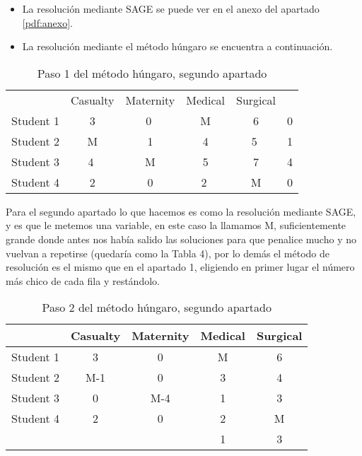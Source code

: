 \documentclass[11pt]{article}
\begin{document}
\begin{itemize}
    \item La resolución mediante SAGE se puede ver en el anexo del apartado \ref{pdf:anexo}.
    \item La resolución mediante el método húngaro se encuentra a continuación.\\
\end{itemize}

\begin{table}[H]
\centering
\begin{tabular}{lccccl}
\cline{1-5}
 & \multicolumn{1}{l}{Casualty} & \multicolumn{1}{l}{Maternity} & \multicolumn{1}{l}{Medical} & \multicolumn{1}{l}{Surgical} &  \\ \cline{1-5}
Student 1 & 3 & \textcircled{0} & M & 6 & 0 \\
Student 2 & M & 1 & 4 & \textcircled{5} & 1 \\
Student 3 & \textcircled{4} & M & 5 & 7 & 4 \\
Student 4 & 2 & 0 & \textcircled{2} & M & 0 \\ \cline{1-5}
\end{tabular}
\caption{Paso 1 del método húngaro, segundo apartado}
\end{table}

Para el segundo apartado lo que hacemos es como la resolución mediante SAGE, y es que le metemos una variable, en este caso la llamamos M, suficientemente grande donde antes nos había salido las soluciones para que penalice mucho y no vuelvan a repetirse (quedaría como la Tabla 4), por lo demás el método de resolución es el mismo que en el apartado 1, eligiendo en primer lugar el número más chico de cada fila y restándolo. 


\begin{table}[H]
\centering
\begin{tabular}{lcccc}
\hline
 & \multicolumn{1}{l}{Casualty} & \multicolumn{1}{l}{Maternity} & \multicolumn{1}{l}{Medical} & \multicolumn{1}{l}{Surgical} \\ \hline
Student 1 & 3 & 0 & M & 6 \\
Student 2 & M-1 & 0 & 3 & 4 \\
Student 3 & 0 & M-4 & 1 & 3 \\
Student 4 & 2 & 0 & 2 & M \\ \hline
& & & 1 & 3
\end{tabular}
\caption{Paso 2 del método húngaro, segundo apartado}
\end{table}
\end{document}
